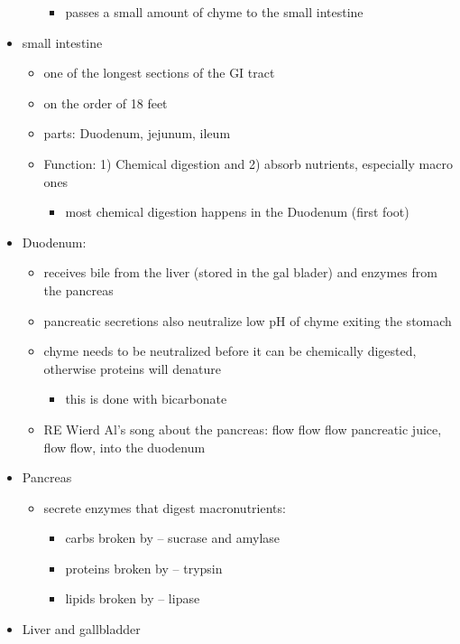 \documentclass{article}
\theoremstyle{definition}
\begin{document}
\begin{itemize}
\begin{itemize}
\begin{itemize}
					\item passes a small amount of chyme to the small intestine
				\end{itemize}
		\end{itemize}
	\item small intestine
		\begin{itemize}
			\item one of the longest sections of the GI tract
			\item on the order of 18 feet
			\item parts: Duodenum, jejunum, ileum
			\item Function: 1) Chemical digestion and 2) absorb nutrients, especially macro ones
				\begin{itemize}
					\item most chemical digestion happens in the Duodenum (first foot)
				\end{itemize}
		\end{itemize}
	\item Duodenum:
		\begin{itemize}
			\item receives bile from the liver (stored in the gal blader) and enzymes from the pancreas
			\item pancreatic secretions also neutralize low pH of chyme exiting the stomach
			\item chyme needs to be neutralized before it can be chemically digested, otherwise proteins will denature
				\begin{itemize}
					\item this is done with bicarbonate
				\end{itemize}
			\item RE Wierd Al's song about the pancreas: flow flow flow pancreatic juice, flow flow, into the duodenum
		\end{itemize}
	\item Pancreas
		\begin{itemize}
			\item secrete enzymes that digest macronutrients:
				\begin{itemize}
					\item carbs broken by -- sucrase and amylase
					\item proteins broken by -- trypsin
					\item lipids broken by -- lipase
				\end{itemize}
		\end{itemize}
	\item Liver and gallbladder

\end{itemize}
\end{document}
